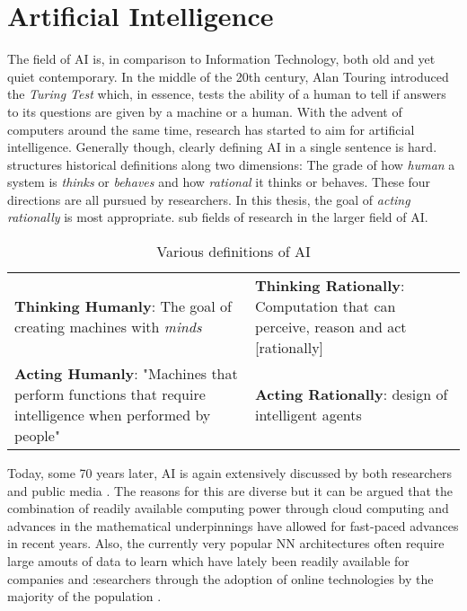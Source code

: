 \section{Artificial Intelligence}%
\label{sec:artificial_intelligence}

The field of \ac {AI} is, in comparison to Information Technology, both old and yet quiet contemporary. In the middle of
the 20th century, Alan Touring introduced the \emph{Turing Test} which, in essence, tests the ability of a human to tell
if answers to its questions are given by a machine or a human. With the advent of computers around the same time,
research has started to aim for artificial intelligence. Generally though, clearly defining \ac {AI} in a single sentence is hard.
\citet{russell2016artificial} structures historical definitions along two dimensions: The grade of how \emph{human} a system is \emph{thinks} or
\emph{behaves} and how \emph{rational} it thinks or behaves. These four directions are all pursued by researchers. In
this thesis, the goal of \emph{acting rationally} is most appropriate. 
sub fields of research in the larger field of \ac {AI}. 

\begin{table}[] 
    \renewcommand{\arraystretch}{2.5}
    \centering
    \begin{tabular}{p{}|p{}} 
        \textbf{Thinking Humanly}: The goal of creating machines with \emph{minds}
&   
        \textbf{Thinking Rationally}: Computation that can perceive, reason and act [rationally]
\\
            \textbf{Acting Humanly}: "Machines that perform functions that require intelligence when performed by people"
&
        \textbf{Acting Rationally}:  design of intelligent agents
    \end{tabular}
    \caption{Various definitions of \ac {AI} \citep{russell2016artificial}  }
    \label{tab:ai_definitions}
\end{table}

Today, some 70 years later, \ac {AI} is again extensively discussed by both researchers and public media
\citep[p.24ff.]{russell2016artificial, arulkumaran2017brief}. The reasons for this are diverse but it can be argued that
the combination of readily available computing power through cloud computing and advances in the mathematical
underpinnings have allowed for fast-paced advances in recent years. Also, the currently very popular \acf {NN}
architectures often require large amouts of data to learn which have lately been readily available for companies and
:esearchers through the adoption of online technologies by the majority of the population
\citep[p.27]{russell2016artificial}.
